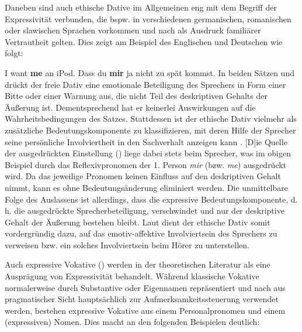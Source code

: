 
Daneben sind auch ethische Dative im Allgemeinen eng mit dem Begriff der Expressivität verbunden, die bspw. in verschiedenen germanischen, romanischen oder slawischen Sprachen vorkommen und nach \citet[61]{Wegener.1989} als \glqq{}Ausdruck familiärer Vertrautheit\grqq{} gelten. Dies zeigt \citet[26f.]{Gutzmann.2019a} am Beispiel des Englischen und Deutschen wie folgt:

\ea  \label{EtDat}
\ea I want \textbf{me} an iPod. \hfill  \citep[][175]{Horn.2008} \label{iPod}
\ex Dass du \textbf{mir} ja nicht zu spät kommst. \hfill  \citep[][5]{Lambert.2007} \label{spät}
 \z
 \z
In beiden Sätzen  und  drückt der freie Dativ eine emotionale Beteiligung des Sprechers in Form einer Bitte oder einer Warnung aus, die nicht Teil des deskriptiven Gehalts der Äußerung ist. Dementsprechend hat er keinerlei Auswirkungen auf die Wahrheitsbedingungen des Satzes. Stattdessen ist der ethische Dativ vielmehr als zusätzliche Bedeutungskomponente zu klassifizieren, mit deren Hilfe der Sprecher seine persönliche Involviertheit in den Sachverhalt anzeigen kann \citep[vgl.][27]{Gutzmann.2019a}. \glqq{}[D]ie Quelle der ausgedrückten Einstellung\grqq{} (\citealt[68]{Wegener.1989}) liege dabei stets beim Sprecher, was im obigen Beispiel durch das Reflexivpronomen der 1. Person \textit{mir} (bzw. \textit{me}) ausgedrückt wird. Da das jeweilige Pronomen keinen Einfluss auf den deskriptiven Gehalt nimmt, kann es ohne Bedeutungsänderung eliminiert werden. Die unmittelbare Folge des Auslassens ist allerdings, dass die expressive Bedeutungskomponente, d.\,h. die ausgedrückte Sprecherbeteiligung, verschwindet und nur der deskriptive Gehalt der Äußerung bestehen bleibt. Laut \citet[69]{Wegener.1989} dient der ethische Dativ somit vordergründig dazu, \glqq{}auf das emotiv-affektive Involviertsein des Sprechers zu verweisen bzw. ein solches Involviertsein beim Hörer {zu unterstellen\grqq{}}.


Auch \glqq{}expressive Vokative\grqq{} (\citealt[172]{Gutzmann.2019a}) werden in der theoretischen Literatur als eine Ausprägung von Expressivität behandelt. Während klassische Vokative normalerweise durch Substantive oder Eigennamen repräsentiert und nach \citet[787]{Zwicky.1974} aus pragmatischer Sicht hauptsächlich zur Aufmerksamkeitssteuerung verwendet werden, bestehen expressive Vokative aus einem Personalpronomen und einem (expressiven) Nomen. Dies macht \citet[188]{Gutzmann.2019a} an den folgenden Beispielen deutlich:

